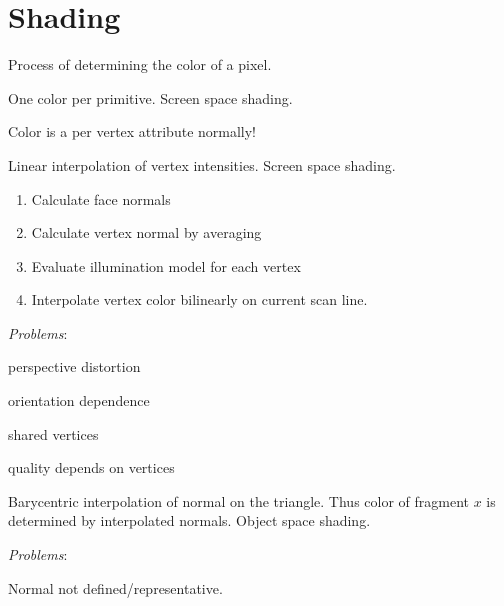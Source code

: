 \section{Shading}

\begin{definition}[Shading]
  Process of determining the color of a pixel.
\end{definition}

\begin{definition}
  One color per primitive. Screen space shading.
\end{definition}

\begin{theorem}
  Color is a per vertex attribute normally!
\end{theorem}

\begin{algorithm}
  Linear interpolation of vertex intensities. Screen space shading.
  \begin{enumerate}
    \item Calculate face normals
    \item Calculate vertex normal by averaging
    \item Evaluate illumination model for each vertex
    \item Interpolate vertex color bilinearly on current scan line.
  \end{enumerate}

  \textit{Problems}:
  \begin{itemize*}
    \item perspective distortion
    \item orientation dependence
    \item shared vertices
    \item quality depends on vertices
  \end{itemize*}
\end{algorithm}


\begin{algorithm}
  Barycentric interpolation of normal on the triangle. Thus color of fragment \(x\) is determined by interpolated normals.
  Object space shading.

  \textit{Problems}:
  \begin{itemize*}
    \item Normal not defined/representative.
  \end{itemize*}
\end{algorithm}

